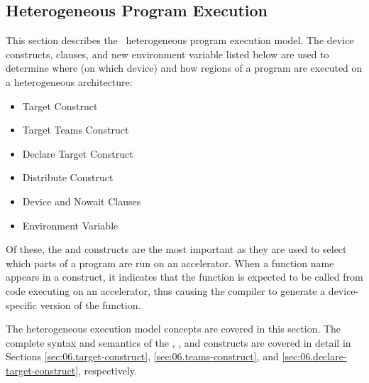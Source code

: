 \subsection{Heterogeneous Program Execution}
\label{sec:06.execution-model}

This section describes the \OMP\ heterogeneous program execution model.
The device constructs, clauses, and new environment variable
listed below are used to determine where (on which device) and how regions of a
program are executed on a heterogeneous architecture: 

\begin{itemize}
  \item Target Construct
  \item Target Teams Construct
  \item Declare Target Construct
  \item Distribute Construct
  \item Device and Nowait Clauses
  \item {} Environment Variable
\end{itemize}

Of these, the  and  constructs are the
most important as they are used to select which parts of a program are run on
an accelerator.  When a function name appears in a 
construct, it indicates that the function is expected to be called from code
executing on an accelerator, thus causing the compiler to generate a
device-specific version of the function.  

The heterogeneous execution model concepts are covered in this section.  The
complete syntax and semantics of the , , and
 constructs are covered in detail in Sections
\ref{sec:06.target-construct}, \ref{sec:06.teams-construct}, and
\ref{sec:06.declare-target-construct}, respectively.

